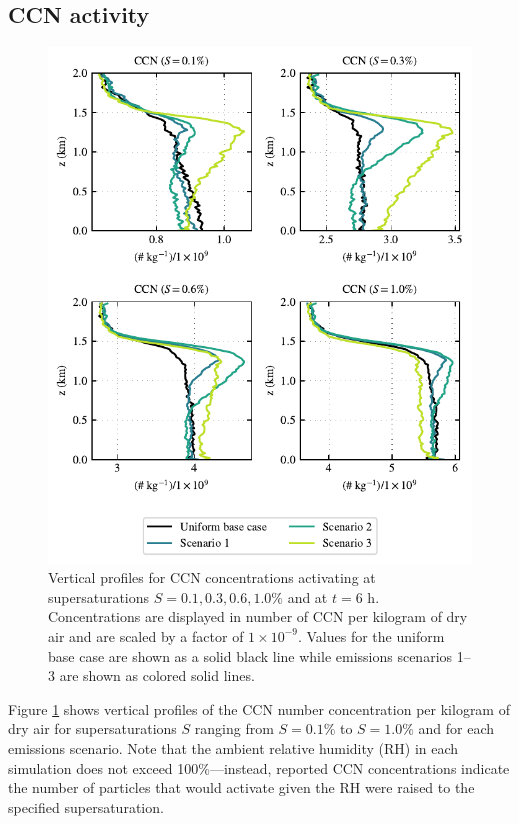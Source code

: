 \documentclass[journal abbreviation, manuscript]{copernicus}
\begin{document}
\subsection{CCN activity}\label{sec:ccn-activ}

\begin{figure}[!h]
	\centering
	\includegraphics[]{figures/aerosol-ccn-vertical-profiles-time36.pdf}
	\caption{Vertical profiles for CCN concentrations activating at supersaturations $S=0.1, 0.3, 0.6, 1.0\%$ and at $t=6$ h. Concentrations are displayed in number of CCN per kilogram of dry air and are scaled by a factor of $1\times10^{-9}$. Values for the uniform base case are shown as a solid black line while emissions scenarios 1--3 are shown as colored solid lines.}
	\label{fig:ccn-vertical-prof}
\end{figure} 

Figure \ref{fig:ccn-vertical-prof} shows vertical profiles of the CCN number concentration per kilogram of dry air for supersaturations $S$ ranging from $S=0.1\%$ to $S=1.0\%$ and for each emissions scenario. Note that the ambient relative humidity (RH) in each simulation does not exceed 100\%---instead, reported CCN concentrations indicate the number of particles that would activate given the RH were raised to the specified supersaturation.
\end{document}
